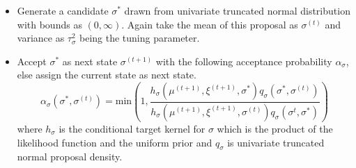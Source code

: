 \documentclass[12pt]{article}
\begin{document}
\begin{enumerate}[label=(\alph*)]
\begin{enumerate}[label=(\roman*)]
\begin{itemize}
\begin{itemize}
\item Generate a candidate $\sigma^{*}$ drawn from univariate truncated normal distribution with bounds as $(0,\infty)$. Again take the mean of this proposal as $\sigma^{(t)}$ and variance as $\tau_{\sigma}^2$ being the tuning parameter.
\item Accept $\sigma^{*}$ as next state $\sigma^{(t+1)}$ with the following acceptance probability $\alpha_\sigma$, else assign the current state as next state.
\[\alpha_\sigma(\sigma^{*},\sigma^{(t)})=\text{min}\left(1,\dfrac{h_\sigma(\mu^{(t+1)},\xi^{(t+1)},\sigma^{*})q_\sigma(\sigma^{*},\sigma^{(t)})}{h_\sigma(\mu^{(t+1)},\xi^{(t+1)},\sigma^{(t)})q_\sigma(\sigma^{t},\sigma^{*})}\right)\]
where $h_\sigma$ is the conditional target kernel for $\sigma$ which is the product of the likelihood function and the uniform prior and $q_\sigma$ is univariate truncated normal proposal density.


\end{itemize}
\end{itemize}
\end{enumerate}
\end{enumerate}
\end{document}
